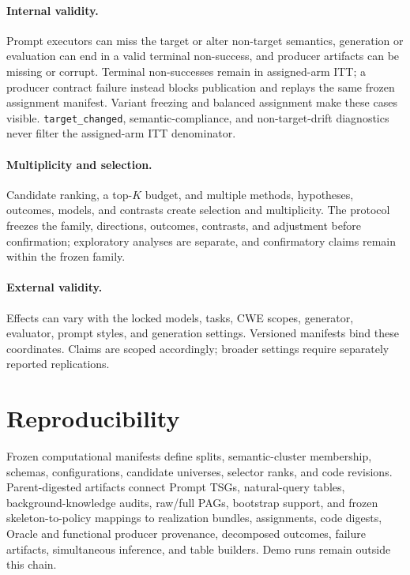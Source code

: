 \documentclass[acmsmall,screen,review,anonymous]{acmart}
\begin{document}
\paragraph{Internal validity.}
Prompt executors can miss the target or alter non-target semantics, generation
or evaluation can end in a valid terminal non-success, and producer artifacts
can be missing or corrupt. Terminal non-successes remain in assigned-arm ITT;
a producer contract failure instead blocks publication and replays the same
frozen assignment manifest. Variant freezing and balanced assignment make these
cases visible.
\texttt{target\_changed}, semantic-compliance, and non-target-drift diagnostics
never filter the assigned-arm ITT denominator.

\paragraph{Multiplicity and selection.}
Candidate ranking, a top-$K$ budget, and multiple methods, hypotheses, outcomes,
models, and contrasts create selection and multiplicity. The protocol freezes
the family, directions, outcomes, contrasts, and adjustment before confirmation;
exploratory analyses are separate, and confirmatory claims remain within the
frozen family.

\paragraph{External validity.}
Effects can vary with the locked models, tasks, CWE scopes, generator,
evaluator, prompt styles, and generation settings. Versioned manifests bind
these coordinates. Claims are scoped accordingly; broader settings require
separately reported replications.

\section{Reproducibility}

Frozen computational manifests define splits, semantic-cluster membership,
schemas, configurations, candidate universes, selector ranks, and code
revisions. Parent-digested artifacts connect Prompt TSGs, natural-query tables,
background-knowledge audits, raw/full PAGs, bootstrap support, and frozen
skeleton-to-policy mappings to realization bundles, assignments, code digests,
Oracle and functional producer provenance, decomposed outcomes, failure
artifacts, simultaneous inference, and table builders. Demo runs remain
outside this chain.
\end{document}
